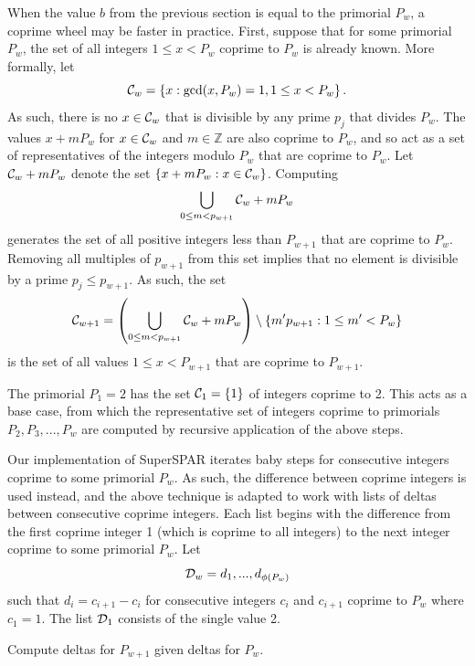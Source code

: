 \documentclass{ucalgthes1}
\theoremstyle{definition}
\newcommand{\algnewline}{\par\noindent\hskip\algorithmicindent}
\newcommand{\ZZ}{\mathbb{Z}}
\begin{document}
When the value $b$ from the previous section is equal to the primorial $P_w$, a coprime wheel may be faster in practice.  First, suppose that for some primorial $P_w$, the set of all integers $1 \le x < P_w$ coprime to $P_w$ is already known.  More formally, let
\[
	\mathcal C_w = \left\{x : \gcd(x, P_w) = 1, 1 \le x < P_w \right\}.
\]
As such, there is no $x \in \mathcal C_w$ that is divisible by any prime $p_j$ that divides $P_w$.  The values $x + mP_w$ for $x \in \mathcal C_w$ and $m \in \ZZ$ are also coprime to $P_w$, and so act as a set of representatives of the integers modulo $P_w$ that are coprime to $P_w$.  Let $\mathcal C_w + mP_w$ denote the set $\{x + mP_w : x \in \mathcal C_w\}$.  Computing
\[
	\bigcup_{0 \le m < p_{w+1}} \mathcal C_w + mP_w
\]
generates the set of all positive integers less than $P_{w+1}$ that are coprime to $P_w$.  Removing all multiples of $p_{w+1}$ from this set implies that no element is divisible by a prime $p_j \le p_{w+1}$.  As such, the set
\[
	\mathcal C_{w+1} =
		\left( \bigcup_{0 \le m < p_{w+1}} \mathcal C_w + mP_w \right)
	    \setminus \{ m' p_{w+1} : 1 \le m' < P_w \}
\]
is the set of all values $1 \le x < P_{w+1}$ that are coprime to $P_{w+1}$.

The primorial $P_1 = 2$ has the set $\mathcal C_1 = \{1\}$ of integers coprime to 2.  This acts as a base case, from which the representative set of integers coprime to primorials $P_2, P_3, ..., P_w$ are computed by recursive application of the above steps.

Our implementation of SuperSPAR iterates baby steps for consecutive integers coprime to some primorial $P_w$.  As such, the difference between coprime integers is used instead, and the above technique is adapted to work with lists of deltas between consecutive coprime integers.  Each list begins with the difference from the first coprime integer 1 (which is coprime to all integers) to the next integer coprime to some primorial $P_w$. Let
\[
	\mathcal D_w = d_1, ..., d_{\phi(P_w)}
\]
such that $d_i = c_{i+1} - c_i$ for consecutive integers $c_i$ and $c_{i+1}$ coprime to $P_w$ where $c_1 = 1$. The list $\mathcal D_1$ consists of the single value 2.

\begin{algorithm}[htb]
\caption{Compute deltas for $P_{w+1}$ given deltas for $P_w$.}
\label{alg:deltaWheel}
\end{algorithm}
\end{document}
